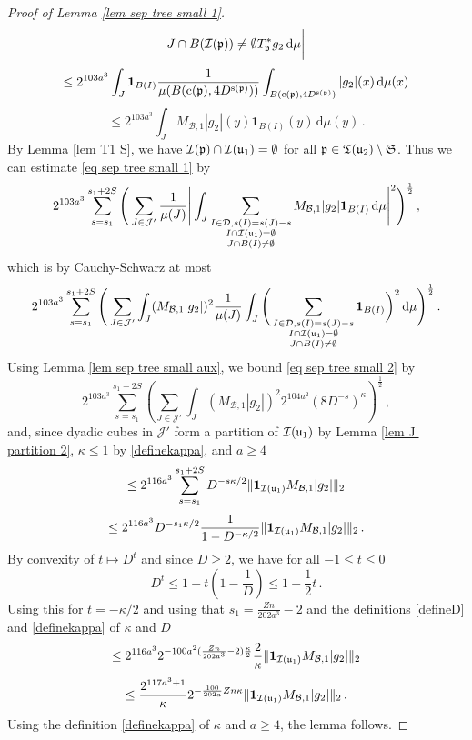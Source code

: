 {\begin{proof}[Proof of Lemma \ref{lem sep tree small 1}]
$${{        J \cap B(\mathcal{I}(\mathfrak p)) \ne \emptyset}} T_{\mathfrak p}^* g_2 \, \mathrm{d}\mu \bigg|
    $$
    $$
        \le 2^{103a^3} \int_J \mathbf{1}_{B(I)} \frac{1}{\mu(B(\mathrm{c}(\mathfrak p), 4D^{\mathrm{s}(\mathfrak p)}))} \int_{B(\mathrm{c}(\mathfrak p), 4D^{\mathrm{s}(\mathfrak p)})} |g_2|(x) \, \mathrm{d}\mu(x)
    $$
    $$
        \le 2^{103a^3} \int_J M_{\mathcal{B},1} |g_2|(y) \mathbf{1}_{B(I)}(y) \, \mathrm{d}\mu(y)\,.
    $$
    By Lemma \ref{lem T1 S}, we have $\mathcal{I}(\mathfrak p) \cap \mathcal{I}(\mathfrak u_1) = \emptyset$ for all $\mathfrak p \in \mathfrak T(\mathfrak u_2) \setminus \mathfrak{S}$.
    Thus we can estimate \eqref{eq sep tree small 1} by
    $$
        2^{103a^3} \sum_{s = s_1}^{s_1 + 2S} \Bigg( \sum_{J \in \mathcal{J}'} \frac{1}{\mu(J)} \Bigg|\int_J \sum_{\substack{I \in \mathcal{D}, s(I) = s(J) - s\\ I \cap \mathcal{I}(\mathfrak u_1) = \emptyset\\
        J \cap B(I) \ne \emptyset}} M_{\mathcal{B},1} |g_2| \mathbf{1}_{B(I)} \, \mathrm{d}\mu \Bigg|^2\Bigg)^{\frac 1 2}\,,
    $$
    which is by Cauchy-Schwarz at most
    \begin{equation}
    \label{eq sep tree small 2}
        2^{103a^3} \sum_{s = s_1}^{s_1 + 2S} \Bigg( \sum_{J \in \mathcal{J}'} \int_J  ( M_{\mathcal{B},1} |g_2|)^2 \frac{1}{\mu(J)} \int_J \Bigg(\sum_{\substack{I \in \mathcal{D}, s(I) = s(J) - s\\ I \cap \mathcal{I}(\mathfrak u_1) = \emptyset\\
        J \cap B(I) \ne \emptyset}} \mathbf{1}_{B(I)}\bigg)^2 \, \mathrm{d}\mu \Bigg)^{\frac 12}\,.
    \end{equation}
    Using Lemma \ref{lem sep tree small aux}, we bound \eqref{eq sep tree small 2} by
    $$
        2^{103a^3} \sum_{s = s_1}^{s_1 + 2S} \left(\sum_{J \in \mathcal{J}'} \int_J (M_{\mathcal{B},1} |g_2|)^2 2^{104a^2} (8 D^{-s})^\kappa\right)^{\frac 1 2}\,,
    $$
    and, since dyadic cubes in $\mathcal{J}'$ form a partition of $\mathcal{I}(\mathfrak u_1)$ by Lemma \ref{lem J' partition 2}, $\kappa \le 1$ by \eqref{definekappa}, and $a \ge 4$
    $$
        \le 2^{116a^3} \sum_{s = s_1}^{s_1 + 2S} D^{-s\kappa/2} \|\mathbf{1}_{\mathcal{I}(\mathfrak u_1)} M_{\mathcal{B},1} |g_2|\|_2
    $$
    $$
        \le 2^{116a^3} D^{-s_1 \kappa /2} \frac{1}{1 - D^{-\kappa/2}} \|\mathbf{1}_{\mathcal{I}(\mathfrak u_1)} M_{\mathcal{B},1} |g_2|\|_2\,.
    $$
    By convexity of $t \mapsto D^t$ and since $D \ge 2$, we have for all $-1 \le t \le 0$
    $$
        D^t \le 1 + t(1 - \frac{1}{D}) \le 1 + \frac{1}{2}t\,.
    $$
    Using this for $t = -\kappa/2$ and using that $s_1 = \frac{Zn}{202a^3} - 2$ and the definitions \eqref{defineD} and \eqref{definekappa} of $\kappa$ and $D$
    $$
        \le 2^{116a^3} 2^{-100a^2(\frac{Zn}{202a^3} - 2) \frac{\kappa}{2}} \frac{2}{\kappa} \|\mathbf{1}_{\mathcal{I}(\mathfrak u_1)} M_{\mathcal{B},1} |g_2|\|_2
    $$
    $$
        \le \frac{2^{117a^3 + 1}}{\kappa} 2^{-\frac{100}{202a}Zn\kappa} \|\mathbf{1}_{\mathcal{I}(\mathfrak u_1)} M_{\mathcal{B},1} |g_2|\|_2\,.
    $$
    Using the definition \eqref{definekappa} of $\kappa$ and $a \ge 4$, the lemma follows.
\end{proof}



}
